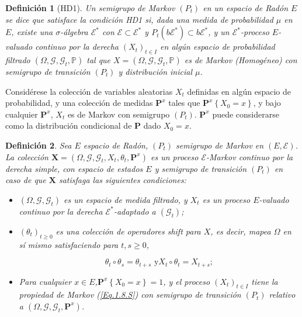 \documentclass{article}
\newtheorem{Def}{Definición}[section]
\newcommand{\prob}{\mathbb{P}}
\newcommand{\ER}{\left(E,\mathcal{E}\right)}
\newcommand{\PE}{\left(X_{t}\right)_{t\in I}}
\newcommand{\SG}{\left(P_{t}\right)}
\newcommand{\CM}{\mathbf{P}^{x}}
\numberwithin{equation}{section}
\begin{document}
\begin{Def}[HD1]\label{Eq.2.1.S}
Un semigrupo de Markov $\left(P_{t}\right)$ en un espacio de
Rad\'on $E$ se dice que satisface la condici\'on {\em HD1} si,
dada una medida de probabilidad $\mu$ en $E$, existe una
$\sigma$-\'algebra $\mathcal{E^{*}}$ con
$\mathcal{E}\subset\mathcal{E}^{*}$ y
$P_{t}\left(b\mathcal{E}^{*}\right)\subset b\mathcal{E}^{*}$, y un
$\mathcal{E}^{*}$-proceso $E$-valuado continuo por la derecha
$\PE$ en alg\'un espacio de probabilidad filtrado
$\left(\Omega,\mathcal{G},\mathcal{G}_{t},\prob\right)$ tal que
$X=\left(\Omega,\mathcal{G},\mathcal{G}_{t},\prob\right)$ es de
Markov (Homog\'eneo) con semigrupo de transici\'on $(P_{t})$ y
distribuci\'on inicial $\mu$.
\end{Def}

Consid\'erese la colecci\'on de variables aleatorias $X_{t}$
definidas en alg\'un espacio de probabilidad, y una colecci\'on de
medidas $\mathbf{P}^{x}$ tales que
$\mathbf{P}^{x}\left\{X_{0}=x\right\}$, y bajo cualquier
$\mathbf{P}^{x}$, $X_{t}$ es de Markov con semigrupo
$\left(P_{t}\right)$. $\mathbf{P}^{x}$ puede considerarse como la
distribuci\'on condicional de $\mathbf{P}$ dado $X_{0}=x$.

\begin{Def}\label{Def.2.2.S}
Sea $E$ espacio de Rad\'on, $\SG$ semigrupo de Markov en $\ER$. La
colecci\'on
$\mathbf{X}=\left(\Omega,\mathcal{G},\mathcal{G}_{t},X_{t},\theta_{t},\CM\right)$
es un proceso $\mathcal{E}$-Markov continuo por la derecha simple,
con espacio de estados $E$ y semigrupo de transici\'on $\SG$ en
caso de que $\mathbf{X}$ satisfaga las siguientes condiciones:
\begin{itemize}
\item[i)] $\left(\Omega,\mathcal{G},\mathcal{G}_{t}\right)$ es un
espacio de medida filtrado, y $X_{t}$ es un proceso $E$-valuado
continuo por la derecha $\mathcal{E}^{*}$-adaptado a
$\left(\mathcal{G}_{t}\right)$;

\item[ii)] $\left(\theta_{t}\right)_{t\geq0}$ es una colecci\'on
de operadores {\em shift} para $X$, es decir, mapea $\Omega$ en
s\'i mismo satisfaciendo para $t,s\geq0$,

\begin{equation}\label{Eq.Shift}
\theta_{t}\circ\theta_{s}=\theta_{t+s}\textrm{ y
}X_{t}\circ\theta_{t}=X_{t+s};
\end{equation}

\item[iii)] Para cualquier $x\in E$,$\CM\left\{X_{0}=x\right\}=1$,
y el proceso $\PE$ tiene la propiedad de Markov (\ref{Eq.1.8.S})
con semigrupo de transici\'on $\SG$ relativo a
$\left(\Omega,\mathcal{G},\mathcal{G}_{t},\CM\right)$.
\end{itemize}
\end{Def}
\end{document}
